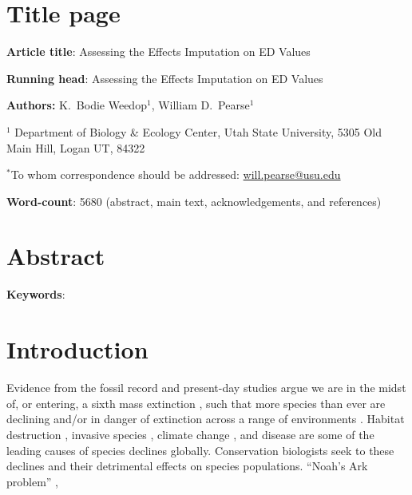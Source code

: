 \documentclass[12pt,english]{article}
\begin{document}
\setlength{\parindent}{0pt}
\section*{Title page}

\textbf{Article title}: Assessing the Effects Imputation on ED Values

\textbf{Running head}: Assessing the Effects Imputation on ED Values

\textbf{Authors:} K.\ Bodie Weedop$^{1}$, William D.\ Pearse$^{1}$\

$^1$ Department of Biology \& Ecology Center, Utah State University,
5305 Old Main Hill, Logan UT, 84322

$^*$To whom correspondence should be addressed:
\url{will.pearse@usu.edu} 

\textbf{Word-count}: 5680 (abstract, main text, acknowledgements, and references)

\clearpage
\section*{Abstract}


\textbf{Keywords}: 

\clearpage
\section*{Introduction}
Evidence from the fossil record and present-day studies argue we are
in the midst of, or entering, a sixth mass extinction
\autocite{Barnosky2011, Ceballos2015}, such that more species than
ever are declining and/or in danger of extinction across a range of
environments \autocite{Wake2008,Thomas2004}. Habitat destruction
\autocite{Brooks2002}, invasive species \autocite{Molnar2008}, climate
change \autocite{Pounds2006}, and disease \autocite{Lips2006} are some
of the leading causes of species declines globally. Conservation
biologists seek to  these
declines and their detrimental effects on species populations.  ``Noah's Ark
problem'' \autocite{Weitzman1998}, 
\end{document}

